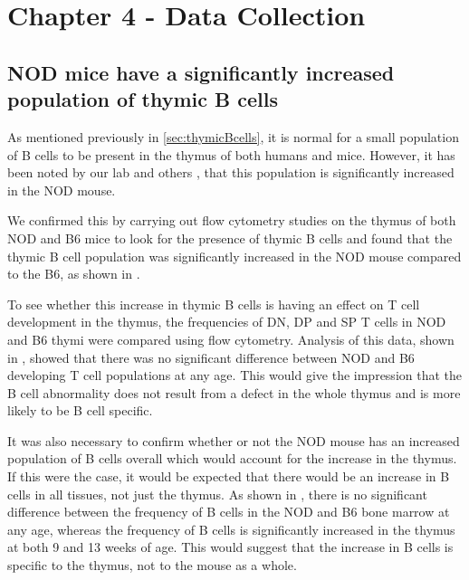 
\chapter{Chapter 4 - Data Collection}




\section{NOD mice have a significantly increased population of thymic B cells}

As mentioned previously in \cref{sec:thymicBcells}, it is normal for a small population of B cells to be present in the thymus of both humans and mice.
However, it has been noted by our lab and others , that this population is significantly increased in the NOD mouse.

We confirmed this by carrying out flow cytometry studies on the thymus of both NOD and B6 mice to look for the presence of thymic B cells and found that the thymic B cell population was significantly increased in the NOD mouse compared to the B6, as shown in .

To see whether this increase in thymic B cells is having an effect on T cell development in the thymus, the frequencies of DN, DP and SP T cells in NOD and B6 thymi were compared using flow cytometry.
Analysis of this data, shown in , showed that there was no significant difference between NOD and B6 developing T cell populations at any age.
This would give the impression that the B cell abnormality does not result from a defect in the whole thymus and is more likely to be B cell specific.

It was also necessary to confirm whether or not the NOD mouse has an increased population of B cells overall which would account for the increase in the thymus.
If this were the case, it would be expected that there would be an increase in B cells in all tissues, not just the thymus.
As shown in , there is no significant difference between the frequency of B cells in the NOD and B6 bone marrow at any age, whereas the frequency of B cells is significantly increased in the thymus at both 9 and 13 weeks of age.
This would suggest that the increase in B cells is specific to the thymus, not to the mouse as a whole.

